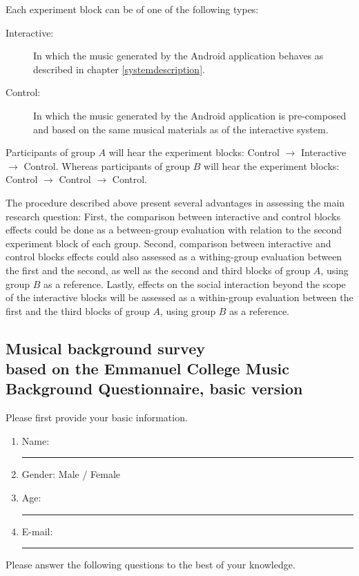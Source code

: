 \documentclass[a4paper,11pt]{article}
\newcommand{\myunderline}{\rule{2in}{.5pt}}
\begin{document}
{Each experiment block can be of one of the following types:
\begin{description}
	\item[Interactive:] In which the music generated by the Android application behaves as described in chapter \ref{systemdescription}.
	\item[Control:] In which the music generated by the Android application is pre-composed and based on the same musical materials as of the interactive system.
\end{description}

Participants of group $A$ will hear the experiment blocks: Control $\rightarrow$ Interactive $\rightarrow$ Control. Whereas participants of group $B$ will hear the experiment blocks: Control $\rightarrow$ Control $\rightarrow$ Control.

The procedure described above present several advantages in assessing the main research question:
First, the comparison between interactive and control blocks effects could be done as a between-group evaluation with relation to the second experiment block of each group.
Second, comparison between interactive and control blocks effects could also assessed as a withing-group evaluation between the first and the second, as well as the second and third blocks of group $A$, using group $B$ as a reference.
Lastly, effects on the social interaction beyond the scope of the interactive blocks will be assessed as a within-group evaluation between the first and the third blocks of group $A$, using group $B$ as a reference.

\begin{appendices}

\section[Musical background survey]{Musical background survey\\
	{\normalsize based on the Emmanuel College Music Background Questionnaire, basic version}}

Please first provide your basic information.

\begin{enumerate}
	\item Name: \myunderline
	\item Gender: Male / Female
	\item Age: \myunderline
	\item E-mail: \myunderline
\end{enumerate}
Please answer the following questions to the best of your knowledge.
\begin{enumerate}[resume]


\end{enumerate}
\end{appendices}}
\end{document}
